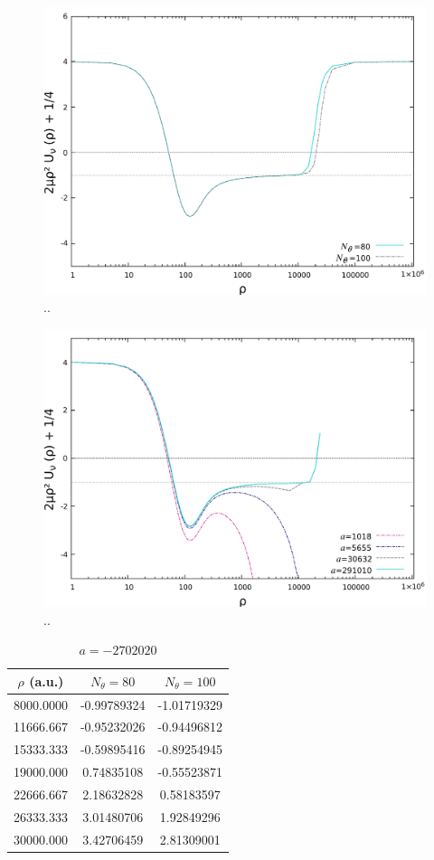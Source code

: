 \begin{figure}
	\includegraphics[width=\linewidth]{diff.pdf}
	\caption{..}
	\label{fig:5}
\end{figure}

\begin{figure}
	\includegraphics[width=\linewidth]{positive_a.pdf}
	\caption{..}
	\label{fig:6}
\end{figure}

\begin{table}[h!]
	\centering
	\begin{tabular}{||c c c||} 
		\hline
		$\rho$ (a.u.) & $N_{\theta}=80$ & $N_{\theta}=100$  \\ [0.5ex] 
		\hline\hline
		8000.0000   & -0.99789324     & -1.01719329  \\ 
		11666.667	 & -0.95232026   & -0.94496812  \\
		15333.333   & -0.59895416  & -0.89254945  \\
		19000.000   & 0.74835108  & -0.55523871   \\
		22666.667   & 2.18632828  & 0.58183597   \\
		26333.333   & 3.01480706  & 1.92849296  \\  
		30000.000   & 3.42706459 & 2.81309001  \\ [1ex] 
		\hline
	\end{tabular}
	\caption{$a = -2702020$}
	\label{table:Res_1}
\end{table} 